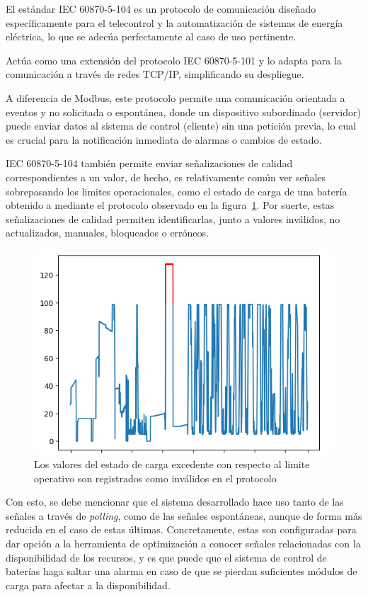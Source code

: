 El estándar IEC 60870-5-104 es un protocolo de comunicación diseñado específicamente para el telecontrol y la automatización de sistemas de energía eléctrica, lo que se adecúa perfectamente al caso de uso pertinente.

Actúa como una extensión del protocolo IEC 60870-5-101 y lo adapta para la comunicación a través de redes TCP/IP, simplificando su despliegue.

A diferencia de Modbus, este protocolo permite una comunicación orientada a eventos y no solicitada o espontánea, donde un dispositivo subordinado (servidor) puede enviar datos al sistema de control (cliente) sin una petición previa, lo cual es crucial para la notificación inmediata de alarmas o cambios de estado.

IEC 60870-5-104 también permite enviar señalizaciones de calidad correspondientes a un valor, de hecho, es relativamente común ver señales sobrepasando los limites operacionales, como el estado de carga de una batería obtenido a mediante el protocolo observado en la figura~\ref{fig:overflow-soc}. Por suerte, estas señalizaciones de calidad permiten identificarlas, junto a valores inválidos, no actualizados, manuales, bloqueados o erróneos.

\begin{figure}
\centering
\includegraphics[width=0.5\linewidth]{figures/overflow-soc.png}
\caption{Los valores del estado de carga excedente con respecto al limite operativo son registrados como inválidos en el protocolo}
\label{fig:overflow-soc}
\end{figure}

Con esto, se debe mencionar que el sistema desarrollado hace uso tanto de las señales a través de \textit{polling}, como de las señales espontáneas, aunque de forma más reducida en el caso de estas últimas. Concretamente, estas son configuradas para dar opción a la herramienta de optimización a conocer señales relacionadas con la disponibilidad de los recursos, y es que puede que el sistema de control de baterías haga saltar una alarma en caso de que se pierdan suficientes módulos de carga para afectar a la disponibilidad.

